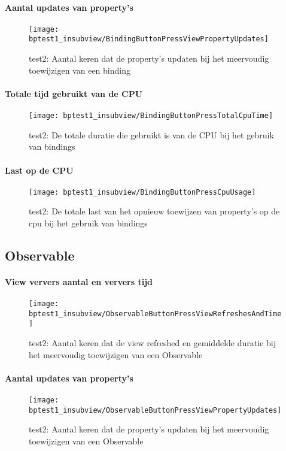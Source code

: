 \paragraph{Aantal updates van property's}
\begin{figure}[H]
    \centering
    \texttt{[image: bptest1\_insubview/BindingButtonPressViewPropertyUpdates]} 
    \caption{test2: Aantal keren dat de property's updaten bij het meervoudig toewijzigen van een binding}
    \label{fig:propertyUpdatesBinding1}
\end{figure}
\paragraph{Totale tijd gebruikt van de CPU}
\begin{figure}[H]
    \centering
    \texttt{[image: bptest1\_insubview/BindingButtonPressTotalCpuTime]} 
    \caption{test2: De totale duratie die gebruikt is van de CPU bij het gebruik van bindings}
    \label{fig:cpuUsageTimeBinding1}
\end{figure}
\paragraph{Last op de CPU}
\begin{figure}[H]
    \centering
    \texttt{[image: bptest1\_insubview/BindingButtonPressCpuUsage]} 
    \caption{test2: De totale last van het opnieuw toewijzen van property's op de cpu bij het gebruik van bindings}
    \label{fig:cpuWeightBinding1}
\end{figure}

\subsection{Observable}
\paragraph{View ververs aantal en ververs tijd}
\begin{figure}[H]
    \centering
    \texttt{[image: bptest1\_insubview/ObservableButtonPressViewRefreshesAndTime]} 
    \caption{test2: Aantal keren dat de view refreshed en gemiddelde duratie bij het meervoudig toewijzigen van een Observable}
    \label{fig:viewRefreshesObservable1}
\end{figure}
\paragraph{Aantal updates van property's}
\begin{figure}[H]
    \centering
    \texttt{[image: bptest1\_insubview/ObservableButtonPressViewPropertyUpdates]} 
    \caption{test2: Aantal keren dat de property's updaten bij het meervoudig toewijzigen van een Observable}
    \label{fig:propertyUpdatesObservable1}
\end{figure}
